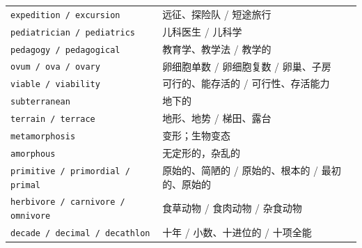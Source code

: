 \documentclass[UTF8,zihao=-4]{ctexart}
\begin{document}
\begin{longtable}{>{\raggedright\arraybackslash}p{4.9cm} >{\raggedright\arraybackslash}p{9.6cm}}
\texttt{expedition / excursion} & 远征、探险队 / 短途旅行 \\
\texttt{pediatrician / pediatrics} & 儿科医生 / 儿科学 \\
\texttt{pedagogy / pedagogical} & 教育学、教学法 / 教学的 \\
\texttt{ovum / ova / ovary} & 卵细胞单数 / 卵细胞复数 / 卵巢、子房 \\
\texttt{viable / viability} & 可行的、能存活的 / 可行性、存活能力 \\
\texttt{subterranean} & 地下的 \\
\texttt{terrain / terrace} & 地形、地势 / 梯田、露台 \\
\texttt{metamorphosis} & 变形；生物变态 \\
\texttt{amorphous} & 无定形的，杂乱的 \\
\texttt{primitive / primordial / primal} & 原始的、简陋的 / 原始的、根本的 / 最初的、原始的 \\
\texttt{herbivore / carnivore / omnivore} & 食草动物 / 食肉动物 / 杂食动物 \\
\texttt{decade / decimal / decathlon} & 十年 / 小数、十进位的 / 十项全能 \\
\bottomrule
\end{longtable}
\end{document}
